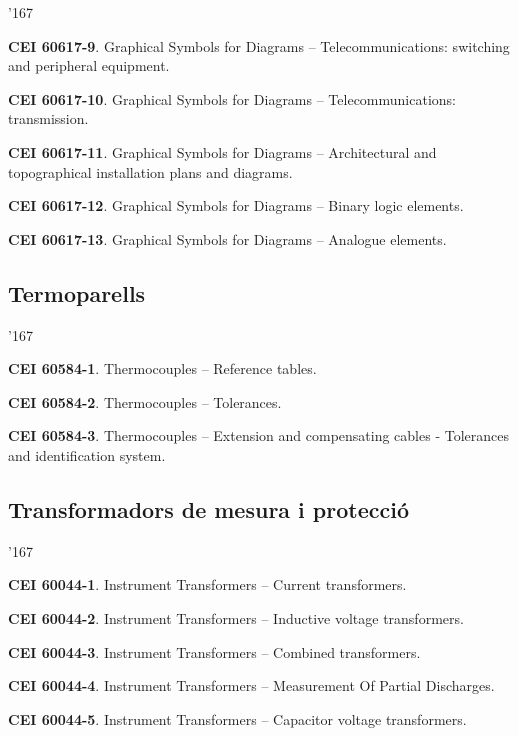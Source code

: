 \begin{dinglist}{'167}
     \item \textbf{CEI 60617-9}. Graphical Symbols for Diagrams -- Telecommunications: switching and peripheral equipment.
      \item \textbf{CEI 60617-10}. Graphical Symbols for Diagrams -- Telecommunications: transmission.
      \item \textbf{CEI 60617-11}. Graphical Symbols for Diagrams -- Architectural and topographical installation plans and diagrams.
      \item \textbf{CEI 60617-12}. Graphical Symbols for Diagrams -- Binary logic elements.
      \item \textbf{CEI 60617-13}. Graphical Symbols for Diagrams -- Analogue elements.
\end{dinglist}


\subsection*{Termoparells} 
\begin{dinglist}{'167}
    \item \textbf{CEI 60584-1}. Thermocouples -- Reference tables.
    \item \textbf{CEI 60584-2}. Thermocouples -- Tolerances.
    \item \textbf{CEI 60584-3}. Thermocouples -- Extension and compensating cables - Tolerances and identification system.
\end{dinglist}


\subsection*{Transformadors de mesura i protecci\'{o}}
\begin{dinglist}{'167}
    \item \textbf{CEI 60044-1}. Instrument Transformers -- Current transformers.
    \item \textbf{CEI 60044-2}. Instrument Transformers -- Inductive voltage transformers.
    \item \textbf{CEI 60044-3}. Instrument Transformers -- Combined transformers.
    \item \textbf{CEI 60044-4}. Instrument Transformers -- Measurement Of Partial Discharges.
    \item \textbf{CEI 60044-5}. Instrument Transformers -- Capacitor voltage transformers.
\end{dinglist}


